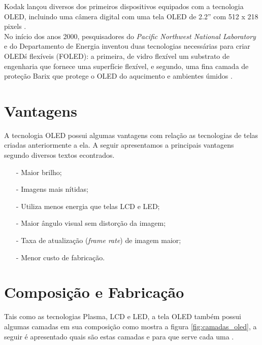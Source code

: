 Kodak lançou diversos dos primeiros dispositivos equipados com a tecnologia OLED, incluindo uma câmera digital com uma tela OLED de 2.2'' com 512 x 218 pixels \cite{WIOLEDT}.\\

No início dos anos 2000, pesquisadores do \textit{Pacific Northwest National Laboratory} e do Departamento de Energia inventou duas tecnologias necessárias para criar OLED\'s flexíveis (FOLED): a primeira, de vidro flexível um substrato de engenharia que fornece uma superfície flexível, e segundo, uma fina camada de proteção Barix que protege o OLED do aqucimento e ambientes úmidos \cite{WIOLEDT}.\\


\section{Vantagens}
\label{sec:vantagens}

A tecnologia OLED possui algumas vantagens com relação as tecnologias de telas criadas anteriormente a ela. A seguir apresentamos a principais vantagens segundo diversos textos econtrados.

\begin{enumerate}
	\item[-] Maior brilho;
	\item[-] Imagens mais nítidas;
	\item[-] Utiliza menos energia que telas LCD e LED;
	\item[-] Maior ângulo visual sem distorção da imagem;
	\item[-] Taxa de atualização (\textit{frame rate}) de imagem maior;
	\item[-] Menor custo de fabricação.
\end{enumerate}

\section{Composição e Fabricação}
\label{sec:composicao}

Tais como as tecnologias Plasma, LCD e LED, a tela OLED também possui algumas camadas em sua composição como mostra a figura \ref{fig:camadas_oled}, a seguir é apresentado quais são estas camadas e para que serve cada uma \cite{HSWOLED}. \\

